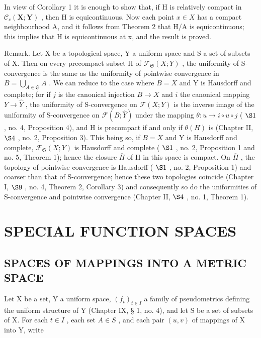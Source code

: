 In view of Corollary 1 it is enough to show that, if H is relatively compact in \(\mathcal{C}_{c}(\mathbf{X};\mathbf{Y})\) , then H is equicontinuous. Now each point \(x\in X\) has a compact neighbourhood A, and it follows from Theorem 2 that H/A is equicontinuous; this implies that H is equicontinuous at x, and the result is proved.

Remark. Let X be a topological space, Y a uniform space and S a set of subsets of X. Then on every precompact subset H of \(\mathcal{F}_{\mathfrak{S}}(X;Y)\) , the uniformity of S-convergence is the same as the uniformity of pointwise convergence in \(B = \bigcup_{A \in \mathfrak{S}} A\) . We can reduce to the case where \(B = X\) and Y is Hausdorff and complete; for if \(j\) is the canonical injection \(B \to X\) and \(i\) the canonical mapping \(Y \to \hat{Y}\) , the uniformity of S-convergence on \(\mathcal{F}(X;Y)\) is the inverse image of the uniformity of S-convergence on \(\mathcal{F}(B;\hat{Y})\) under the mapping \(\theta : u \to i \circ u \circ j\) ( \(\S 1\) , no. 4, Proposition 4), and H is precompact if and only if \(\theta(H)\) is (Chapter II, \(\S 4\) , no. 2, Proposition 3). This being so, if \(B = X\) and Y is Hausdorff and complete, \(\mathcal{F}_{\mathfrak{S}}(X;Y)\) is Hausdorff and complete ( \(\S 1\) , no. 2, Proposition 1 and no. 5, Theorem 1); hence the closure \(\overline{H}\) of H in this space is compact. On \(\overline{H}\) , the topology of pointwise convergence is Hausdorff ( \(\S 1\) , no. 2, Proposition 1) and coarser than that of S-convergence; hence these two topologies coincide (Chapter I, \(\S 9\) , no. 4, Theorem 2, Corollary 3) and consequently so do the uniformities of S-convergence and pointwise convergence (Chapter II, \(\S 4\) , no. 1, Theorem 1).

\section{SPECIAL FUNCTION SPACES}

\subsection{SPACES OF MAPPINGS INTO A METRIC SPACE}

Let X be a set, Y a uniform space, \((f_{t})_{t\in I}\) a family of pseudometrics defining the uniform structure of Y (Chapter IX, § 1, no. 4), and let S be a set of subsets of X. For each \(t\in I\) , each set \(A\in S\) , and each pair \((u,v)\) of mappings of X into Y, write

